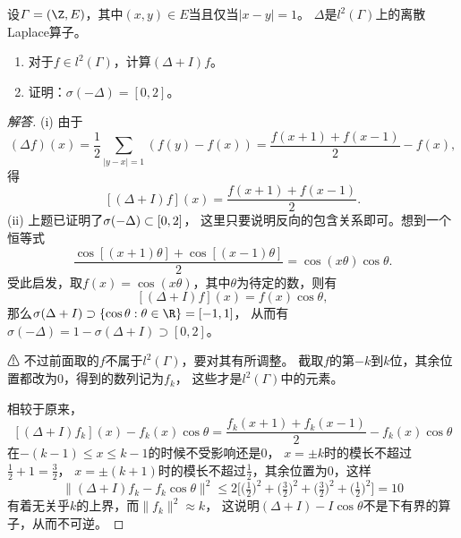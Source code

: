 \begin{18}
    设$\varGamma=(\Z,E)$，其中$(x,y) \in E$当且仅当$|x-y|=1$。
    $\Delta$是$l^2(\varGamma)$上的离散Laplace算子。
    \begin{enumerate}
    \item[(i)] 对于$f \in l^2(\varGamma)$，计算$(\Delta+I)f$。
    \item[(ii)] 证明：$\sigma(-\Delta)=[0,2]$。
    \end{enumerate}
\end{18}
\begin{proof}[解答]
    (i) 由于
    \[(\Delta f)(x)=\frac{1}{2}\sum_{|y-x|=1}(f(y)-f(x))
    =\frac{f(x+1)+f(x-1)}{2}-f(x),\]
    得\[[(\Delta+I)f](x)=\frac{f(x+1)+f(x-1)}{2}.\]
    (ii) 上题已证明了$\sigma(-\Delta)\subset[0,2]$，
    这里只要说明反向的包含关系即可。想到一个恒等式
    \[\frac{\cos[(x+1)\theta]+\cos[(x-1)\theta]}{2}=\cos(x\theta)\cos\theta.\]
    受此启发，取$f(x)=\cos(x\theta)$，其中$\theta$为待定的数，则有
    \[[(\Delta+I)f](x)=f(x)\cos\theta,\]
    那么$\sigma(\Delta+I)\supset\{\cos\theta:\theta\in\R\}=[-1,1]$，
    从而有$\sigma(-\Delta)=1-\sigma(\Delta+I)\supset[0,2]$。

    ⚠ 不过前面取的$f$不属于$l^2(\varGamma)$，要对其有所调整。
    截取$f$的第$-k$到$k$位，其余位置都改为$0$，得到的数列记为$f_k$，
    这些才是$l^2(\varGamma)$中的元素。
    相较于原来，
    \[[(\Delta+I)f_k](x)-f_k(x)\cos\theta
    =\frac{f_k(x+1)+f_k(x-1)}{2}-f_k(x)\cos\theta\]
    在$-(k-1) \leqslant x \leqslant k-1$的时候不受影响还是$0$，
    $x=\pm k$时的模长不超过$\frac{1}{2}+1=\frac{3}{2}$，
    $x=\pm(k+1)$时的模长不超过$\frac{1}{2}$，其余位置为$0$，这样
    \[\|(\Delta+I)f_k-f_k\cos\theta\|^2
    \leqslant2\big[\big(\tfrac{1}{2}\big)^2+\big(\tfrac{3}{2}\big)^2
    +\big(\tfrac{3}{2}\big)^2+\big(\tfrac{1}{2}\big)^2\big]=10\]
    有着无关乎$k$的上界，而$\|f_k\|^2 \approx k$，
    这说明$(\Delta+I)-I\cos\theta$不是下有界的算子，从而不可逆。
\end{proof}

